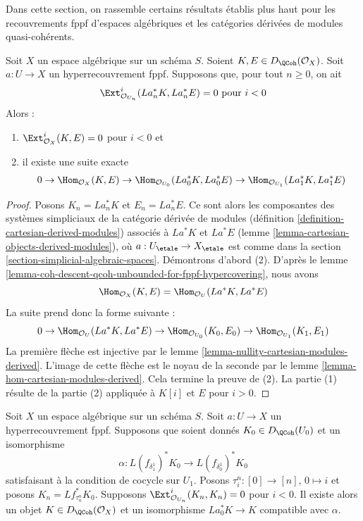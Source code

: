 \noindent
Dans cette section, on rassemble certains résultats établis plus haut
pour les recouvrements fppf d'espaces algébriques
et les catégories dérivées de modules quasi-cohérents.

\begin{lemma}
\label{lemma-fppf-neg-ext-zero-hom}
Soit $X$ un espace algébrique sur un schéma $S$.
Soient $K, E \in D_\QCoh(\mathcal{O}_X)$.
Soit $a : U \to X$ un hyperrecouvrement fppf.
Supposons que, pour tout $n \geq 0$, on ait
$$
\Ext_{\mathcal{O}_{U_n}}^i(La_n^*K, La_n^*E) = 0
\text{ pour } i < 0
$$
Alors :
\begin{enumerate}
\item $\Ext_{\mathcal{O}_X}^i(K, E) = 0$ pour $i < 0$ et
\item il existe une suite exacte
$$
0
\to
\Hom_{\mathcal{O}_X}(K, E)
\to
\Hom_{\mathcal{O}_{U_0}}(La_0^*K, La_0^*E)
\to
\Hom_{\mathcal{O}_{U_1}}(La_1^*K, La_1^*E)
$$
\end{enumerate}
\end{lemma}

\begin{proof}
Posons $K_n = La_n^*K$ et $E_n = La_n^*E$. Ce sont alors les composantes des
systèmes simpliciaux de la catégorie dérivée de modules
(définition \ref{definition-cartesian-derived-modules})
associés à $La^*K$ et $La^*E$
(lemme \ref{lemma-cartesian-objects-derived-modules}),
où $a : U_\etale \to X_\etale$ est comme dans la section
\ref{section-simplicial-algebraic-spaces}.
Démontrons d'abord (2). D'après le
lemme \ref{lemma-coh-descent-qcoh-unbounded-for-fppf-hypercovering},
nous avons
$$
\Hom_{\mathcal{O}_X}(K, E) =
\Hom_{\mathcal{O}_U}(La^*K, La^*E)
$$
La suite prend donc la forme suivante :
$$
0
\to
\Hom_{\mathcal{O}_U}(La^*K, La^*E)
\to
\Hom_{\mathcal{O}_{U_0}}(K_0, E_0)
\to
\Hom_{\mathcal{O}_{U_1}}(K_1, E_1)
$$
La première flèche est injective par
le lemme \ref{lemma-nullity-cartesian-modules-derived}.
L'image de cette flèche est le noyau de la seconde
par le lemme \ref{lemma-hom-cartesian-modules-derived}.
Cela termine la preuve de (2).
La partie (1) résulte de la partie (2) appliquée à
$K[i]$ et $E$ pour $i > 0$.
\end{proof}

\begin{lemma}
\label{lemma-fppf-glue-neg-ext-zero}
Soit $X$ un espace algébrique sur un schéma $S$.
Soit $a : U \to X$ un hyperrecouvrement fppf.
Supposons que soient donnés $K_0 \in D_\QCoh(U_0)$ et un isomorphisme
$$
\alpha :
L(f_{\delta_1^1})^*K_0
\longrightarrow
L(f_{\delta_0^1})^*K_0
$$
satisfaisant à la condition de cocycle sur $U_1$. Posons
$\tau^n_i : [0] \to [n]$, $0 \mapsto i$ et
posons $K_n = Lf_{\tau^n_n}^*K_0$.
Supposons $\Ext^i_{\mathcal{O}_{U_n}}(K_n, K_n) = 0$ pour $i < 0$.
Il existe alors un objet $K \in D_\QCoh(\mathcal{O}_X)$
et un isomorphisme $La_0^*K \to K$ compatible avec $\alpha$.
\end{lemma}


